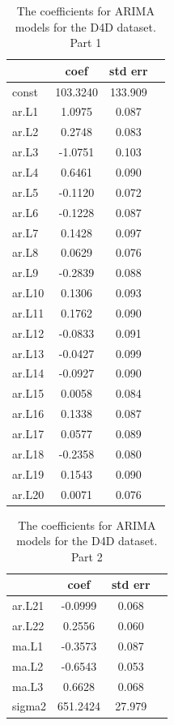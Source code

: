 \documentclass[12pt,a4paper]{article}
\theoremstyle{myplain}
\numberwithin{equation}{section}
\begin{document}
\begin{table}[h!]
\label{tab:table7}
\begin{center}
\begin{tabular}{|l|c|c|c|}
\hline
 & coef  &  std err \\
\hline
const     &    103.3240  &  133.909 \\
\hline
ar.L1     &     1.0975  &    0.087 \\
\hline
ar.L2     &     0.2748     & 0.083 \\
\hline
ar.L3     &    -1.0751    &  0.103 \\
\hline
ar.L4     &     0.6461   &   0.090 \\
\hline
ar.L5     &     -0.1120    &  0.072 \\
\hline
ar.L6     &    -0.1228    &  0.087 \\
\hline
ar.L7     &    0.1428    &  0.097 \\
\hline
ar.L8     &     0.0629  &    0.076 \\
\hline
ar.L9     &    -0.2839 &     0.088 \\
\hline
ar.L10    &    0.1306 &     0.093 \\
\hline
ar.L11    &     0.1762     & 0.090 \\
\hline
ar.L12    &    -0.0833    &  0.091 \\
\hline
ar.L13    &    -0.0427   &   0.099 \\
\hline
ar.L14    &     -0.0927 &     0.090 \\
\hline
ar.L15    &    0.0058  &    0.084 \\
\hline
ar.L16    &    0.1338 &     0.087 \\
\hline
ar.L17    &     0.0577     & 0.089 \\
\hline
ar.L18    &    -0.2358    &  0.080 \\
\hline
ar.L19    &    0.1543    &  0.090 \\
\hline
ar.L20    &    0.0071   &   0.076 \\
\hline
\end{tabular}
\end{center}
\caption{The coefficients for ARIMA models for the D4D dataset. Part 1}
\end{table}

\begin{table}[h!]
\label{tab:table8}
\begin{center}
\begin{tabular}{|l|c|c|c|}
\hline
 & coef  &  std err \\
\hline
ar.L21    &    -0.0999 &     0.068 \\
\hline
ar.L22    &     0.2556    &  0.060 \\
\hline
ma.L1     &    -0.3573     & 0.087 \\
\hline
ma.L2     &    -0.6543    &  0.053 \\
\hline
ma.L3     &     0.6628   &   0.068 \\
\hline
sigma2    &    651.2424 &    27.979 \\
\hline
\end{tabular}
\end{center}
\caption{The coefficients for ARIMA models for the D4D dataset. Part 2}
\end{table}
\end{document}

